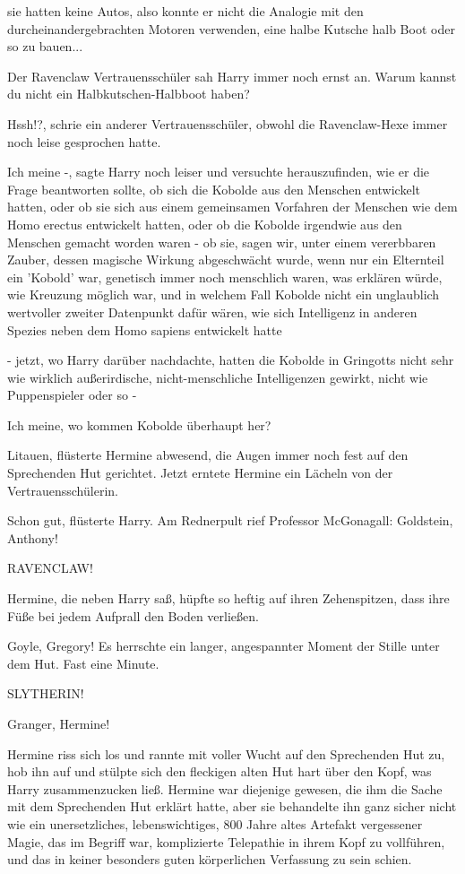 sie hatten keine Autos, also konnte er nicht die Analogie mit den
durcheinandergebrachten Motoren verwenden, \glqq{}eine halbe Kutsche halb Boot
oder so zu bauen...\grqq{}

Der Ravenclaw Vertrauensschüler sah Harry immer noch ernst an. \glqq{}Warum
kannst du nicht ein Halbkutschen-Halbboot haben?\grqq{}

\glqq{}Hssh!?\grqq{}, schrie ein anderer Vertrauensschüler, obwohl die
Ravenclaw-Hexe immer noch leise gesprochen hatte.

\glqq{}Ich meine -\grqq{}, sagte Harry noch leiser und versuchte herauszufinden,
wie er die Frage beantworten sollte, ob sich die Kobolde aus den Menschen
entwickelt hatten, oder ob sie sich aus einem gemeinsamen Vorfahren der Menschen
wie dem Homo erectus entwickelt hatten, oder ob die Kobolde irgendwie aus den
Menschen gemacht worden waren - ob sie, sagen wir, unter einem vererbbaren
Zauber, dessen magische Wirkung abgeschwächt wurde, wenn nur ein Elternteil ein
'Kobold' war, genetisch immer noch menschlich waren, was erklären würde, wie
Kreuzung möglich war, und in welchem Fall Kobolde nicht ein unglaublich
wertvoller zweiter Datenpunkt dafür wären, wie sich Intelligenz in anderen
Spezies neben dem Homo sapiens entwickelt hatte

- jetzt, wo Harry darüber nachdachte, hatten die Kobolde in Gringotts nicht sehr
wie wirklich außerirdische, nicht-menschliche Intelligenzen gewirkt, nicht wie
Puppenspieler oder so -

\glqq{}Ich meine, wo kommen Kobolde überhaupt her?\grqq{}

\glqq{}Litauen\grqq{}, flüsterte Hermine abwesend, die Augen immer noch fest auf
den Sprechenden Hut gerichtet. Jetzt erntete Hermine ein Lächeln von der
Vertrauensschülerin.

\glqq{}Schon gut\grqq{}, flüsterte Harry. Am Rednerpult rief Professor
McGonagall: \glqq{}Goldstein, Anthony!\grqq{}

\glqq{}RAVENCLAW!\grqq{}

Hermine, die neben Harry saß, hüpfte so heftig auf ihren Zehenspitzen, dass ihre
Füße bei jedem Aufprall den Boden verließen.

\glqq{}Goyle, Gregory!\grqq{} Es herrschte ein langer, angespannter Moment der
Stille unter dem Hut. Fast eine Minute.

\glqq{}SLYTHERIN!\grqq{}

\glqq{}Granger, Hermine!\grqq{}

Hermine riss sich los und rannte mit voller Wucht auf den Sprechenden Hut zu,
hob ihn auf und stülpte sich den fleckigen alten Hut hart über den Kopf, was
Harry zusammenzucken ließ. Hermine war diejenige gewesen, die ihm die Sache mit
dem Sprechenden Hut erklärt hatte, aber sie behandelte ihn ganz sicher nicht wie
ein unersetzliches, lebenswichtiges, 800 Jahre altes Artefakt vergessener Magie,
das im Begriff war, komplizierte Telepathie in ihrem Kopf zu vollführen, und das
in keiner besonders guten körperlichen Verfassung zu sein schien.

